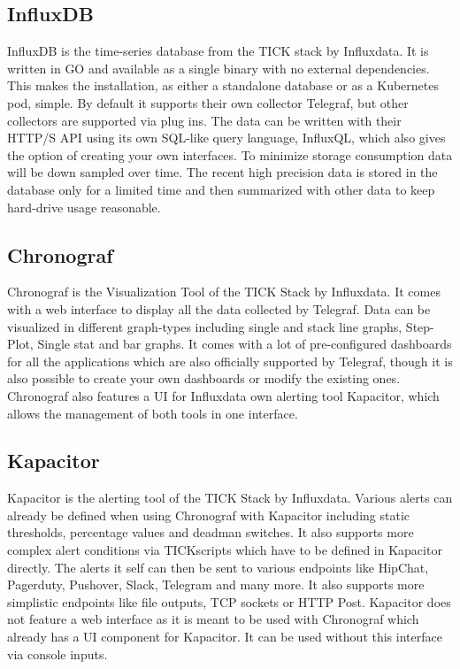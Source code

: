 \subsection{InfluxDB}
InfluxDB is the time-series database from the TICK stack by Influxdata. It is written in GO and available as a single binary with no external dependencies. This makes the installation, as either a standalone database or as a Kubernetes pod, simple.
By default it supports their own collector Telegraf, but other collectors are supported via plug ins. The data can be written with their  HTTP/S API using its own SQL-like query language, InfluxQL, which also gives the option of creating your own interfaces.
To minimize storage consumption data will be down sampled over time. The recent high precision data is stored in the database only for a limited time and then summarized with other data to keep hard-drive usage reasonable. 
\subsection{Chronograf}
Chronograf is the Visualization Tool of the TICK Stack by Influxdata. It comes with a web interface to display all the data collected by Telegraf. Data can be visualized in different graph-types including single and stack line graphs, Step-Plot, Single stat and bar graphs. It comes with a lot of pre-configured dashboards for all the applications which are also officially supported by Telegraf, though it is also possible to create your own dashboards or modify the existing ones. 
Chronograf also features a UI for Influxdata own alerting tool Kapacitor, which allows the management of both tools in one interface.
\subsection{Kapacitor}
Kapacitor is the alerting tool of the TICK Stack by Influxdata. Various alerts can already be defined when using Chronograf with Kapacitor including static thresholds, percentage values and deadman switches. It also supports more complex alert conditions via TICKscripts which have to be defined in Kapacitor directly.
The alerts it self can then be sent to various endpoints like HipChat, Pagerduty, Pushover, Slack, Telegram and many more. It also supports more simplistic endpoints like file outputs, TCP sockets or HTTP Post.
Kapacitor does not feature a web interface as it is meant to be used with Chronograf which already has a UI component for Kapacitor. It can be used without this interface via console inputs.
